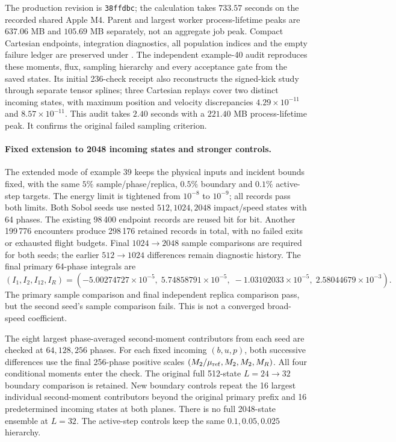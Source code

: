 \documentclass[11pt,letterpaper]{article}
\begin{document}
The production revision is \texttt{38ffdbc}; the calculation takes
$733.57$ seconds on the recorded shared Apple M4. Parent and largest worker
process-lifetime peaks are $637.06$ MB and $105.69$ MB separately, not an
aggregate job peak. Compact Cartesian endpoints, integration diagnostics,
all population indices and the empty failure ledger are preserved under
.
The independent example-40 audit reproduces these moments, flux, sampling
hierarchy and every acceptance gate from the saved states. Its initial
236-check receipt also reconstructs the signed-kick study through separate
tensor splines; three Cartesian replays cover two distinct incoming states,
with maximum position and velocity discrepancies $4.29\times10^{-11}$ and
$8.57\times10^{-11}$. This audit takes $2.40$ seconds with a $221.40$ MB
process-lifetime peak. It confirms the original failed sampling criterion.

\paragraph{Fixed extension to 2048 incoming states and stronger controls.}
The extended mode of example 39 keeps the physical inputs and incident bounds
fixed, with the same $5\%$ sample/phase/replica, $0.5\%$ boundary and
$0.1\%$ active-step targets. The energy limit is tightened from $10^{-8}$
to $10^{-9}$; all records pass both limits. Both Sobol seeds use nested $512,1024,2048$
impact/speed states with 64 phases. The existing 98\,400 endpoint records are
reused bit for bit. Another 199\,776 encounters produce 298\,176 retained
records in total, with no failed exits or exhausted flight budgets. Final
$1024\to2048$ sample comparisons are required for both seeds; the earlier
$512\to1024$ differences remain diagnostic history. The final primary
64-phase integrals are
\[
 (I_1,I_2,I_{12},I_R)=
 (-5.00274727\times10^{-5},\;5.74858791\times10^{-5},\;
 -1.03102033\times10^{-5},\;2.58044679\times10^{-3}).
\]
The primary sample comparison and final independent replica comparison
pass, but the second seed's sample comparison fails. This is not a
converged broad-speed coefficient.

The eight largest phase-averaged second-moment contributors from each
seed are checked at $64,128,256$ phases. For each fixed incoming
$(b,u,p)$, both successive differences use the final 256-phase positive
scales $(M_2/\mu_{\rm ref},M_2,M_2,M_R)$. All four conditional moments
enter the check. The original full 512-state $L=24\to32$ boundary
comparison is retained. New boundary controls repeat the 16 largest
individual second-moment contributors beyond the original primary prefix
and 16 predetermined incoming states at both planes. There is no full
2048-state ensemble at $L=32$. The active-step controls keep the same
$0.1,0.05,0.025$ hierarchy.
\end{document}
